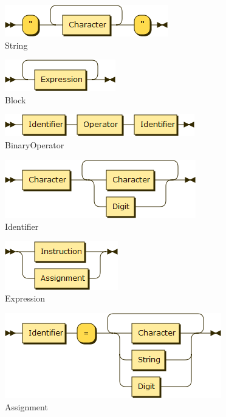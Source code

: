 \begin{figure}[h!]
\centering
\includegraphics[scale=1]{kepek/rr_string.png}
\caption{String}
\label{fig:rr_string}
\end{figure}

\begin{figure}[h!]
\centering
\includegraphics[scale=1]{kepek/rr_block.png}
\caption{Block}
\label{fig:rr_block}
\end{figure}

\begin{figure}[h!]
\centering
\includegraphics[scale=1]{kepek/rr_binaryoperator.png}
\caption{BinaryOperator}
\label{fig:rr_binaryoperator}
\end{figure}

\begin{figure}[h!]
\centering
\includegraphics[scale=0.5]{kepek/rr_identifier.png}
\caption{Identifier}
\label{fig:rr_identifier}
\end{figure}

\begin{figure}[h!]
\centering
\includegraphics[scale=0.5]{kepek/rr_expression.png}
\caption{Expression}
\label{fig:rr_expression}
\end{figure}

\begin{figure}[h!]
\centering
\includegraphics[scale=1]{kepek/rr_assignment.png}
\caption{Assignment}
\label{fig:rr_assignment}
\end{figure}

